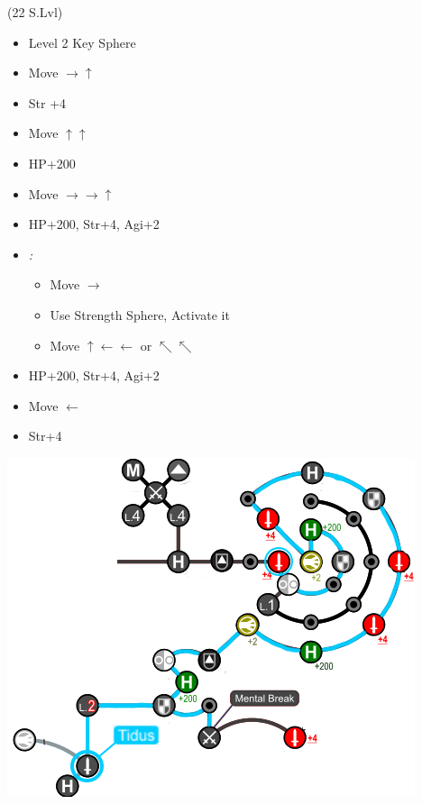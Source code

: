 \begin{spheregrid}
	\begin{itemize}
		\tidusf (22 S.Lvl)
		\begin{itemize}
			\item Level 2 Key Sphere
			\item Move $\rightarrow\uparrow$
			\item Str +4
			\item Move $\uparrow\uparrow$
			\item HP+200
			\item Move $\rightarrow\rightarrow\uparrow$
			\item HP+200, Str+4, Agi+2
			\item \textit{\blitzwin:}
			      \begin{itemize}
				      \item Move $\rightarrow$
				      \item Use Strength Sphere, Activate it
				      \item Move $\uparrow\leftarrow\leftarrow$ or $\nwarrow\nwarrow$
			      \end{itemize}
			\item HP+200, Str+4, Agi+2
			\item Move $\leftarrow$
			\item Str+4
		\end{itemize}
		\includegraphics{graphics/Tidus_post_crawler}
	\end{itemize}
\end{spheregrid}
